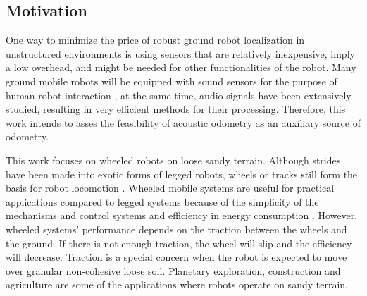 \subsection{Motivation} \label{subsec:motivation}

One way to minimize the price of robust ground robot localization in
unstructured environments is using sensors that are relatively inexpensive,
imply a low overhead, and might be needed for other functionalities of the
robot. Many ground mobile robots will be equipped with sound sensors for the
purpose of human-robot interaction \cite{VoiceForklift}, at the same time,
audio signals have been extensively studied, resulting in very efficient
methods for their processing. Therefore, this work intends to asses the
feasibility of acoustic odometry as an auxiliary source of odometry.

This work focuses on wheeled robots on loose sandy terrain. Although strides
have been made into exotic forms of legged robots, wheels or tracks still form
the basis for robot locomotion \cite{Sanchez09}. Wheeled mobile systems are
useful for practical applications compared to legged systems because of the
simplicity of the mechanisms and control systems and efficiency in energy
consumption \cite{Masayoshi2006}. However, wheeled systems' performance depends
on the traction between the wheels and the ground. If there is not enough
traction, the wheel will slip and the efficiency will decrease. Traction is a
special concern when the robot is expected to move over granular non-cohesive
loose soil. Planetary exploration, construction and agriculture are some of the
applications where robots operate on sandy terrain.